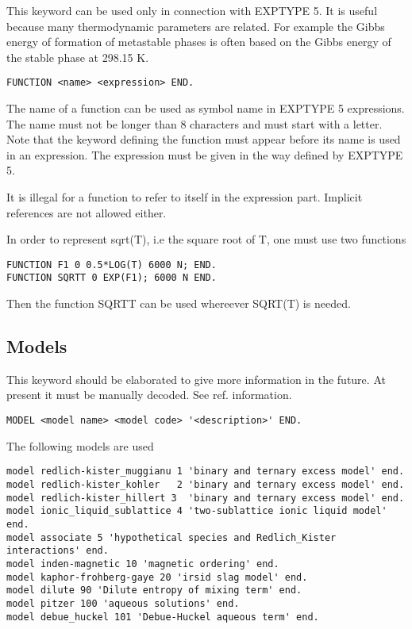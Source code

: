 \documentclass[12pt]{article}
\begin{document}
This keyword can be used only in connection with EXPTYPE 5. It is
useful because many thermodynamic parameters are related. For example
the Gibbs energy of formation of metastable phases is often based on
the Gibbs energy of the stable phase at 298.15 K.

\begin{verbatim}
FUNCTION <name> <expression> END.
\end{verbatim}

The name of a function can be used as symbol name in EXPTYPE 5
expressions. The name must not be longer than 8 characters and must
start with a letter. Note that the keyword defining the function must
appear before its name is used in an expression. The expression must
be given in the way defined by EXPTYPE 5.

It is illegal for a function to refer to itself in the expression
part. Implicit references are not allowed either.

In order to represent sqrt(T), i.e the square root of T, one must use
two functions

\begin{verbatim}
FUNCTION F1 0 0.5*LOG(T) 6000 N; END.
FUNCTION SQRTT 0 EXP(F1); 6000 N END.
\end{verbatim}

Then the function SQRTT can be used whereever SQRT(T) is needed.

\subsection{Models}

This keyword should be elaborated to give more information in the
future. At present it must be manually decoded. See ref. %
information.

\begin{verbatim}
MODEL <model name> <model code> '<description>' END.
\end{verbatim}

The following models are used

\begin{verbatim}
model redlich-kister_muggianu 1 'binary and ternary excess model' end.
model redlich-kister_kohler   2 'binary and ternary excess model' end.
model redlich-kister_hillert 3  'binary and ternary excess model' end.
model ionic_liquid_sublattice 4 'two-sublattice ionic liquid model' end.
model associate 5 'hypothetical species and Redlich_Kister interactions' end.
model inden-magnetic 10 'magnetic ordering' end.
model kaphor-frohberg-gaye 20 'irsid slag model' end.
model dilute 90 'Dilute entropy of mixing term' end.
model pitzer 100 'aqueous solutions' end.
model debue_huckel 101 'Debue-Huckel aqueous term' end.
\end{verbatim}
\end{document}
